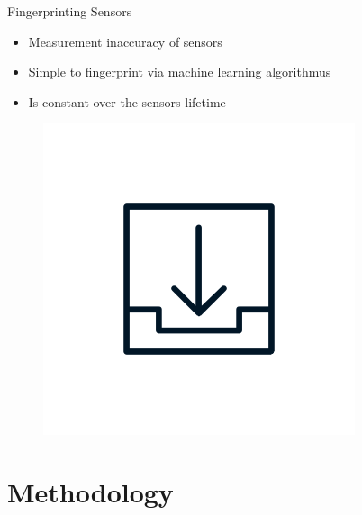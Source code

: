 \documentclass[aspectratio=169]{beamer}
[aspectratio=169] %
\begin{document}
\begin{frame}{Fingerprinting Sensors}
  \begin{minipage}{0.49\textwidth} 
    \begin{itemize}
      \item Measurement inaccuracy of sensors
      \item Simple to fingerprint via machine learning algorithmus
      \item Is constant over the sensors lifetime
    \end{itemize}
  \end{minipage}
  \hfill
  \begin{minipage}{0.49\textwidth} 
    \begin{figure}
      \centering
      \includegraphics[height=0.5\textheight]{figures/download.png}
    \end{figure}
  \end{minipage}
\end{frame}


\section{Methodology}
\end{document}
